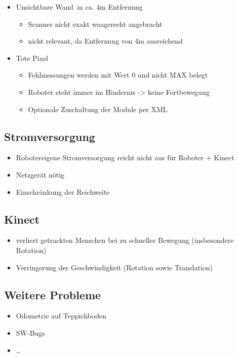\begin{itemize}
	\item \glqq Unsichtbare Wand\grqq\ in ca. 4m Entfernung
	\begin{itemize}
		\item Scanner nicht exakt waagerecht angebracht
		\item nicht relevant, da Entfernung von 4m ausreichend
	\end{itemize}
	\item \glqq Tote Pixel\grqq
	\begin{itemize}
		\item Fehlmessungen werden mit Wert 0 und nicht MAX belegt
		\item Roboter steht immer im Hindernis -> keine Fortbewegung
		\item Optionale Zuschaltung der Module per XML
	\end{itemize}
\end{itemize}


\subsection{Stromversorgung}

\begin{itemize}
	\item Robotereigene Stromversorgung reicht nicht aus für Roboter + Kinect
	\item Netzgerät nötig
	\item Einschränkung der Reichweite
\end{itemize}

\subsection{Kinect}

\begin{itemize}
	\item verliert getrackten Menschen bei zu schneller Bewegung (insbesondere Rotation)
	\item Verringerung der Geschwindigkeit (Rotation sowie Translation)
\end{itemize}


\subsection{Weitere Probleme}

\begin{itemize}
	\item Odometrie auf Teppichboden
	\item SW-Bugs
	\item \ldots
\end{itemize}
